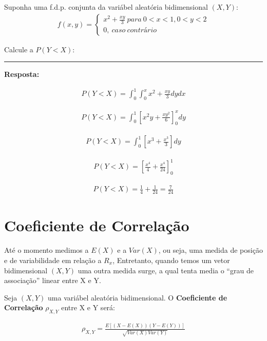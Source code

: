 \documentclass[
  letterpaper,
  DIV=11,
  numbers=noendperiod]{scrartcl}
\begin{document}
\begin{exemplo}

Suponha uma f.d.p. conjunta da variábel aleatória bidimensional
\((X,Y)\): \[\begin{array}{ccc}
f(x,y)=\left\{\begin{matrix} x^{2}+ \frac{xy}{3} \ para \ 0<x<1,0<y<2
\\ 0,\ caso\ contrário
\end{matrix}\right.
\end{array}\]

Calcule a \(P(Y<X)\):

\begin{center}\rule{0.5\linewidth}{0.5pt}\end{center}

\textbf{Resposta:}

\[\begin{array}{ccc}
P(Y<X)=\int_{0}^{1}\int_{0}^{x} x^{2}+ \frac{xy}{3} dydx 
\end{array}\]

\[\begin{array}{ccc}
P(Y<X)=\int_{0}^{1} [x^{2}y+ \frac{xy^{2}}{6}]_0^{x} dy 
\end{array}\]

\[\begin{array}{ccc}
P(Y<X)=\int_{0}^{1} [x^{3}+ \frac{x^{3}}{3}] dy 
\end{array}\]

\[\begin{array}{ccc}
P(Y<X)= [\frac{x^{4}}{4}+ \frac{x^{4}}{24}]_0^{1} 
\end{array}\]

\[\begin{array}{ccc}
P(Y<X)= \frac{1}{4}+\frac{1}{24}=\frac{7}{24}
\end{array}\]

\end{exemplo}

\section{Coeficiente de
Correlação}\label{coeficiente-de-correlauxe7uxe3o}

Até o momento medimos a \(E(X)\) e a \(Var(X)\), ou seja, uma medida de
posição e de variabilidade em relação a \(R_x\), Entretanto, quando
temos um vetor bidimensional \((X,Y)\) uma outra medida surge, a qual
tenta media o ``grau de associação'' linear entre X e Y.

\begin{definicao}

Seja \((X,Y)\) uma variábel aleatória bidimensional. O
\textbf{Coeficiente de Correlação} \(\rho_{X,Y}\) entre X e Y será:

\[\begin{array}{ccc}
\rho_{X,Y}=\frac{E[(X-E(X))(Y-E(Y))]}{\sqrt{Var(X)Var(Y)}}
\end{array}\]

\end{definicao}
\end{document}

